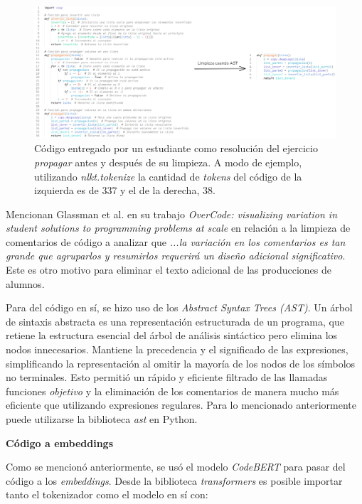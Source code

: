 \documentclass[11pt,a4paper,twoside,openany]{tesis}
\begin{document}
\begin{figure}[H]
    \centering
    \includegraphics[width=1\textwidth]{imagenes/ast.PNG}
    \caption{Código entregado por un estudiante como resolución del ejercicio \emph{propagar} antes y después de su limpieza. A modo de ejemplo, utilizando \emph{nlkt.tokenize} la cantidad de \emph{tokens} del código de la izquierda es de 337 y el de la derecha, 38.}
\end{figure}

Mencionan Glassman et al. en su trabajo \emph{OverCode: visualizing variation in student solutions to programming problems at scale} \cite{overcode} en relación a la limpieza de comentarios de código a analizar que \emph{...la variación en los comentarios es tan grande que agruparlos y resumirlos requerirá un diseño adicional significativo}. Este es otro motivo para eliminar el texto adicional de las producciones de alumnos.

Para del código en sí, se hizo uso de los \emph{Abstract Syntax Trees (AST)}. Un árbol de sintaxis abstracta es una representación estructurada de un programa, que retiene la estructura esencial del árbol de análisis sintáctico pero elimina los nodos innecesarios. Mantiene la precedencia y el significado de las expresiones, simplificando la representación al omitir la mayoría de los nodos de los símbolos no terminales\cite{cooper2011engineering}. Esto permitió un rápido y eficiente filtrado de las llamadas funciones \emph{objetivo} y la eliminación de los comentarios de manera mucho más eficiente que utilizando expresiones regulares. Para lo mencionado anteriormente puede utilizarse la biblioteca \emph{ast} \cite{ast} en Python.



\textbf{Código a embeddings}

Como se mencionó anteriormente, se usó el modelo \emph{CodeBERT} para pasar del código a los \emph{embeddings}. Desde la biblioteca \emph{transformers} \cite{roberta_model} es posible importar tanto el tokenizador como el modelo en sí con:
\end{document}
